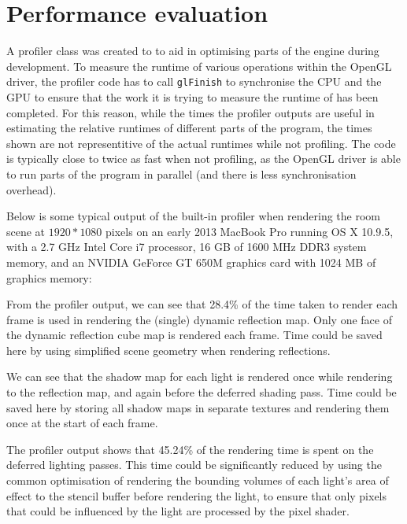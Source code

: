 \documentclass[11pt]{scrartcl} %
\newcommand{\code}[1]{{\texttt{#1}}}
\begin{document}
\section{Performance evaluation}

    A profiler class was created to to aid in optimising parts of the engine
    during development. To measure the runtime of various operations within the
    OpenGL driver, the profiler code has to call \code{glFinish} to synchronise
    the CPU and the GPU to ensure that the work it is trying to measure the
    runtime of has been completed. For this reason, while the times the
    profiler outputs are useful in estimating the relative runtimes of
    different parts of the program, the times shown are not representitive of
    the actual runtimes while not profiling. The code is typically close to
    twice as fast when not profiling, as the OpenGL driver is able to run parts
    of the program in parallel (and there is less synchronisation overhead).

    Below is some typical output of the built-in profiler when rendering the
    room scene at $1920*1080$ pixels on an early 2013 MacBook Pro running OS X
    10.9.5, with a 2.7 GHz Intel Core i7 processor, 16 GB of 1600 MHz DDR3
    system memory, and an NVIDIA GeForce GT 650M graphics card with 1024 MB of
    graphics memory:

    {
        \small
        
    }


    From the profiler output, we can see that 28.4\% of the time taken to
    render each frame is used in rendering the (single) dynamic reflection map.
    Only one face of the dynamic reflection cube map is rendered each frame.
    Time could be saved here by using simplified scene geometry when rendering
    reflections.


    We can see that the shadow map for each light is rendered once while
    rendering to the reflection map, and again before the deferred shading
    pass. Time could be saved here by storing all shadow maps in separate
    textures and rendering them once at the start of each frame.


    The profiler output shows that 45.24\% of the rendering time is spent on
    the deferred lighting passes. This time could be significantly reduced by
    using the common optimisation of rendering the bounding volumes of each
    light's area of effect to the stencil buffer before rendering the light, to
    ensure that only pixels that could be influenced by the light are processed
    by the pixel shader.
\end{document}
